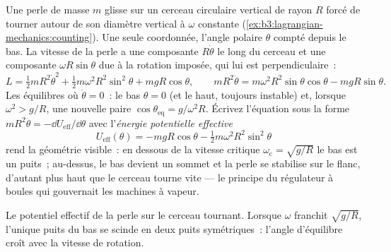 \begin{example}\label{ex:b3:lagrangian-mechanics:hoop}
Une perle de masse $m$ glisse sur un cerceau circulaire vertical de
rayon $R$ forcé de tourner autour de son diamètre vertical à $\omega$
constante (\cref{ex:b3:lagrangian-mechanics:counting}). Une seule
coordonnée, l'angle polaire $\theta$ compté depuis le bas. La vitesse
de la perle a une composante $R\dot\theta$ le long du cerceau et une
composante $\omega R\sin\theta$ due à la rotation imposée, qui lui est
perpendiculaire~:
\[
L = \tfrac12 mR^2\dot\theta^2 + \tfrac12 m\omega^2R^2\sin^2\theta
 + mgR\cos\theta ,
\qquad
mR^2\ddot\theta = m\omega^2R^2\sin\theta\cos\theta - mgR\sin\theta .
\]
Les équilibres où $\ddot\theta = 0$~: le bas $\theta = 0$ (et le haut,
toujours instable) et, lorsque $\omega^2 > g/R$, une nouvelle paire
$\cos\theta_{\text{eq}} = g/\omega^2R$. Écrivez l'équation sous la forme
$mR^2\ddot\theta = -\dd U_{\text{eff}}/\dd\theta$ avec
l'\emph{énergie potentielle effective}
\[
U_{\text{eff}}(\theta) = -mgR\cos\theta
 - \tfrac12 m\omega^2R^2\sin^2\theta
\]
rend la géométrie visible~: en dessous de la vitesse critique
$\omega_{\text{c}} = \sqrt{g/R}$ le bas est un puits~; au-dessus, le
bas devient un sommet et la perle se stabilise sur le flanc, d'autant
plus haut que le cerceau tourne vite --- le principe du régulateur à
boules qui gouvernait les machines à vapeur.
\end{example}

\begin{omfigure}

{\small Le potentiel effectif de la perle sur le cerceau tournant.
Lorsque $\omega$ franchit $\sqrt{g/R}$, l'unique puits du bas se scinde
en deux puits symétriques~: l'angle d'équilibre croît avec la vitesse
de rotation.}
\end{omfigure}

